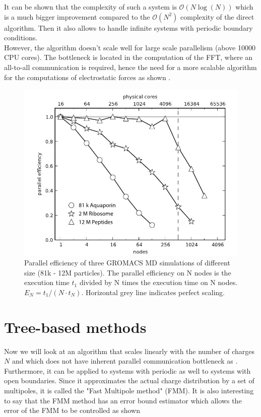 \documentclass[11pt,twoside,a4paper]{report}
\begin{document}
It can be shown that the complexity of such a system is $\mathcal{O}(N \log(N))$ which is a much bigger improvement compared to the $\mathcal{O}(N^2)$ complexity of the direct algorithm. Then it also allows to handle infinite systems with periodic boundary conditions.\\ However, the algorithm doesn't scale well for large scale parallelism (above 10000 CPU cores)\cite{kutzner2013scaling}. The bottleneck is located in the computation of the FFT, where an all-to-all communication is required, hence the need for a more scalable algorithm for the computations of electrostatic forces as shown \cite{kutzner2013scaling}.

\begin{figure}[H]
\includegraphics[scale=0.6]{scalingMUC}
 \centering 
\caption{ Parallel efficiency of three GROMACS MD simulations of different size (81k - 12M particles). The parallel efficiency on N nodes is the execution time $t_1$ divided by N times the execution time on N nodes. $E_N = t_1 / (N\cdot t_N)$. Horizontal grey line indicates perfect scaling.}
\label{fig:scaling}
\end{figure}



\section{Tree-based methods}

Now we will look at an algorithm that scales linearly with the number of charges $N$ and which does not have inherent parallel communication bottleneck as \cite{kutzner2013scaling}.
Furthermore, it can be applied to systems with periodic as well to systems with open boundaries. Since it approximates the actual charge distribution by a set of multipoles, it is called the "Fast Multipole method" (FMM). It is also interesting to say that the FMM method has an error bound estimator which allows the error of the FMM to be controlled as shown \cite{dachsel2010corrected}
    
\end{document}

